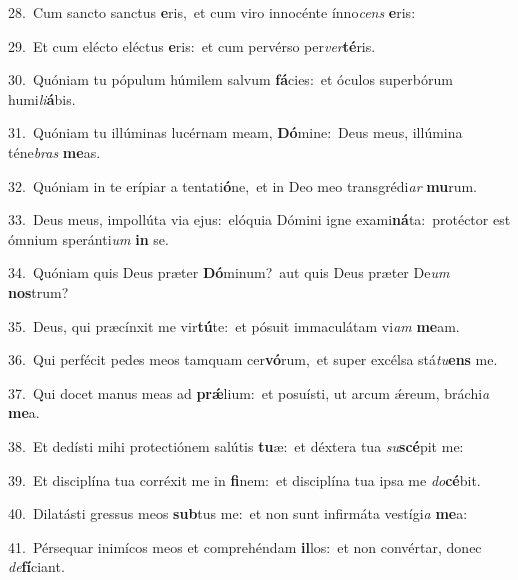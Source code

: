 {\numbfont\textcolor{\numbcolor}{28.}}~Cum sancto sanctus \textbf{e}\-ris,~\star et cum viro innocénte ínno\textit{cens} \textbf{e}\-ris:\par
{\numbfont\textcolor{\numbcolor}{29.}}~Et cum elécto eléctus \textbf{e}\-ris:~\star et cum pervérso per\-\textit{ver}\-\textbf{té}ris.\par
{\numbfont\textcolor{\numbcolor}{30.}}~Quóniam tu pópulum húmilem salvum \textbf{fá}\-cies:~\star et óculos superbórum humi\-\textit{li}\-\textbf{á}bis.\par
{\numbfont\textcolor{\numbcolor}{31.}}~Quóniam tu illúminas lucérnam meam, \textbf{Dó}\-mine:~\star Deus meus, illúmina téne\textit{bras} \textbf{me}\-as.\par
{\numbfont\textcolor{\numbcolor}{32.}}~Quóniam in te erípiar a tentati\-\textbf{ó}\-ne,~\star et in Deo meo transgrédi\textit{ar} \textbf{mu}\-rum.\par
{\numbfont\textcolor{\numbcolor}{33.}}~Deus meus, impollúta via ejus:~\dagger elóquia Dómini igne exami\-\textbf{ná}\-ta:~\star protéctor est ómnium speránti\textit{um} \textbf{in} se.\par
{\numbfont\textcolor{\numbcolor}{34.}}~Quóniam quis Deus præter \textbf{Dó}\-minum?~\star aut quis Deus præter De\textit{um} \textbf{nos}\-trum?\par
{\numbfont\textcolor{\numbcolor}{35.}}~Deus, qui præcínxit me vir\-\textbf{tú}\-te:~\star et pósuit immaculátam vi\textit{am} \textbf{me}\-am.\par
{\numbfont\textcolor{\numbcolor}{36.}}~Qui perfécit pedes meos tamquam cer\-\textbf{vó}\-rum,~\star et super excélsa stá\-\textit{tu}\-\textbf{ens} me.\par
{\numbfont\textcolor{\numbcolor}{37.}}~Qui docet manus meas ad \textbf{prǽ}\-lium:~\star et posuísti, ut arcum ǽreum, bráchi\textit{a} \textbf{me}\-a.\par
{\numbfont\textcolor{\numbcolor}{38.}}~Et dedísti mihi protectiónem salútis \textbf{tu}\-æ:~\star et déxtera tua \textit{su}\-\textbf{scé}pit me:\par
{\numbfont\textcolor{\numbcolor}{39.}}~Et disciplína tua corréxit me in \textbf{fi}\-nem:~\star et disciplína tua ipsa me \textit{do}\-\textbf{cé}bit.\par
{\numbfont\textcolor{\numbcolor}{40.}}~Dilatásti gressus meos \textbf{sub}\-tus me:~\star et non sunt infirmáta vestígi\textit{a} \textbf{me}\-a:\par
{\numbfont\textcolor{\numbcolor}{41.}}~Pérsequar inimícos meos et comprehéndam \textbf{il}\-los:~\star et non convértar, donec \textit{de}\-\textbf{fí}ciant.\par
